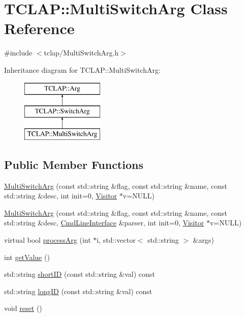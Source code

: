\hypertarget{class_t_c_l_a_p_1_1_multi_switch_arg}{}\section{T\+C\+L\+A\+P\+:\+:Multi\+Switch\+Arg Class Reference}
\label{class_t_c_l_a_p_1_1_multi_switch_arg}


{\ttfamily \#include $<$tclap/\+Multi\+Switch\+Arg.\+h$>$}

Inheritance diagram for T\+C\+L\+A\+P\+:\+:Multi\+Switch\+Arg\+:\begin{figure}[H]
\begin{center}
\leavevmode
\includegraphics[height=3.000000cm]{class_t_c_l_a_p_1_1_multi_switch_arg}
\end{center}
\end{figure}
\subsection*{Public Member Functions}
\begin{DoxyCompactItemize}
\item 
\hyperlink{class_t_c_l_a_p_1_1_multi_switch_arg_a37db9658517f206fd69936e1458d59b0}{Multi\+Switch\+Arg} (const std\+::string \&flag, const std\+::string \&name, const std\+::string \&desc, int init=0, \hyperlink{class_t_c_l_a_p_1_1_visitor}{Visitor} $\ast$v=N\+U\+L\+L)
\item 
\hyperlink{class_t_c_l_a_p_1_1_multi_switch_arg_a0443d4a222630ac45aa67e40f2de3541}{Multi\+Switch\+Arg} (const std\+::string \&flag, const std\+::string \&name, const std\+::string \&desc, \hyperlink{class_t_c_l_a_p_1_1_cmd_line_interface}{Cmd\+Line\+Interface} \&parser, int init=0, \hyperlink{class_t_c_l_a_p_1_1_visitor}{Visitor} $\ast$v=N\+U\+L\+L)
\item 
virtual bool \hyperlink{class_t_c_l_a_p_1_1_multi_switch_arg_a91c3d349570f21d8af6dc90767d747a2}{process\+Arg} (int $\ast$i, std\+::vector$<$ std\+::string $>$ \&args)
\item 
int \hyperlink{class_t_c_l_a_p_1_1_multi_switch_arg_a0389e414c11ebbab4a88dfbbf3af18bd}{get\+Value} ()
\item 
std\+::string \hyperlink{class_t_c_l_a_p_1_1_multi_switch_arg_a083c07003f948691e94ce94d0b6376ed}{short\+I\+D} (const std\+::string \&val) const 
\item 
std\+::string \hyperlink{class_t_c_l_a_p_1_1_multi_switch_arg_a0b0aacc09c93462bab4347f86db0fccd}{long\+I\+D} (const std\+::string \&val) const 
\item 
void \hyperlink{class_t_c_l_a_p_1_1_multi_switch_arg_ac320530811dbca7fdcb2a41ab252fce4}{reset} ()
\end{DoxyCompactItemize}
